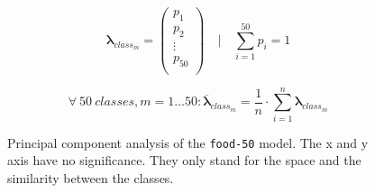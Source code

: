 \documentclass[10pt]{article}
\newcommand\inputpgf[2]{{
\let\pgfimageWithoutPath\pgfimage
\renewcommand{\pgfimage}[2][]{\pgfimageWithoutPath[##1]{#1/##2}}

}}
\newif\ifen
\newif\ifde
\newcommand{\en}[1]{\ifen#1\fi}
\newcommand{\de}[1]{\ifde#1\fi}
\begin{document}
					\begin{equation}
						\boldsymbol\lambda_{class_{m}} = 
						\left(
							\begin{array}{c}
							p_{1}\\
							p_{2}\\
							\vdots\\
							p_{50}\\
							\end{array}
						\right)
						\quad\Biggl\lvert \quad \sum_{i=1}^{50} p_i = 1
					\end{equation}
					
					\de{Von diesen Wahrscheinlichkeitsvektoren wird nun jeweils für jede Klasse ein Durchschnittsvektor aller \(n\) Elemente bestimmt, welche zur entsprechenden Klasse wirklich gehören. Man erhält also für dieses 50 Klassenmodell entsprechend 50 Klassenvektoren mit der Dimension 50.}
					\en{From these probability vectors, an average vector of all \(n\) elements is determined for each class, which really belong to the respective class. Thus, for this 50 class model, one obtains 50 class vectors with the dimension 50:}
					
					\begin{equation}
						\forall\ 50\ classes, m = 1 \dots 50:
						\overline{\boldsymbol\lambda}_{class_{m}} =
						\frac{1}{n} \cdot \sum_{i=1}^{n} \boldsymbol\lambda_{class_{m}}
					\end{equation}
					
					\de{Mittels Principal component analysis werden diese mehrdimensionalen Vektoren in einem zweidimensionalen Raum transformiert, um diese grafisch darstellen zu können.} 
					\en{Principal component analysis is used to transform these multidimensional vectors into a two-dimensional space in order to display them visually (Figure \ref{fig:analysis_pca_food_50}).}
				
					\begin{figure}[H]
						\begin{center}
							\scalebox{0.5}{
								\inputpgf{images/pgf}{pca.pgf}
							}
						\end{center}
						\caption[Principal component analysis of the \texttt{food-50} model]{Principal component analysis of the \texttt{food-50} model. The x and y axis have no significance. They only stand for the space and the similarity between the classes.}
						\label{fig:analysis_pca_food_50}
					\end{figure}
					
\end{document}
